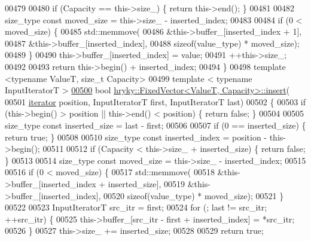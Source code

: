 \begin{DoxyCode}
00479     
00480     \textcolor{keywordflow}{if} (Capacity == this->size\_) \{ \textcolor{keywordflow}{return} this->end(); \}
00481 
00482     size\_type \textcolor{keyword}{const} moved\_size      = this->size\_ - inserted\_index;
00483 
00484     \textcolor{keywordflow}{if} (0 < moved\_size) \{
00485         std::memmove(
00486             &this->buffer\_[inserted\_index + 1],
00487             &this->buffer\_[inserted\_index],
00488             \textcolor{keyword}{sizeof}(value\_type) * moved\_size);
00489     \}
00490     this->buffer\_[inserted\_index] = value;
00491     ++this->size\_;
00492 
00493     \textcolor{keywordflow}{return} this->begin() + inserted\_index;
00494 \}
00498 \textcolor{keyword}{template} <\textcolor{keyword}{typename} ValueT, \textcolor{keywordtype}{size\_t} Capacity>
00499 \textcolor{keyword}{template} < \textcolor{keyword}{typename} InputIteratorT >
\hypertarget{fixed__vector_8h_source_l00500}{}\hyperlink{classhryky_1_1_fixed_vector_a63f5ed5e699bd6f5b0c068bb19e34ec4}{00500} \textcolor{keywordtype}{bool} \hyperlink{classhryky_1_1_fixed_vector}{hryky::FixedVector<ValueT, Capacity>::insert}(
00501     \hyperlink{classhryky_1_1iterator_1_1random_1_1_mutable}{iterator} position, InputIteratorT first, InputIteratorT last)
00502 \{
00503     \textcolor{keywordflow}{if} (this->begin() > position || this->end() < position) \{ \textcolor{keywordflow}{return} \textcolor{keyword}{false}; \}
00504 
00505     size\_type \textcolor{keyword}{const} inserted\_size = last - first;
00506 
00507     \textcolor{keywordflow}{if} (0 == inserted\_size) \{ \textcolor{keywordflow}{return} \textcolor{keyword}{true}; \}
00508 
00510     size\_type \textcolor{keyword}{const} inserted\_index = position - this->begin();
00511     
00512     \textcolor{keywordflow}{if} (Capacity < this->size\_ + inserted\_size) \{ \textcolor{keywordflow}{return} \textcolor{keyword}{false}; \}
00513 
00514     size\_type \textcolor{keyword}{const} moved\_size = this->size\_ - inserted\_index;
00515 
00516     \textcolor{keywordflow}{if} (0 < moved\_size) \{
00517         std::memmove(
00518             &this->buffer\_[inserted\_index + inserted\_size],
00519             &this->buffer\_[inserted\_index],
00520             \textcolor{keyword}{sizeof}(value\_type) * moved\_size);
00521     \}
00522 
00523     InputIteratorT src\_itr  = first;
00524     \textcolor{keywordflow}{for} (; last != src\_itr; ++src\_itr) \{
00525         this->buffer\_[src\_itr - first + inserted\_index] = *src\_itr;
00526     \}
00527     this->size\_ += inserted\_size;
00528 
00529     \textcolor{keywordflow}{return} \textcolor{keyword}{true};

\end{DoxyCode}
